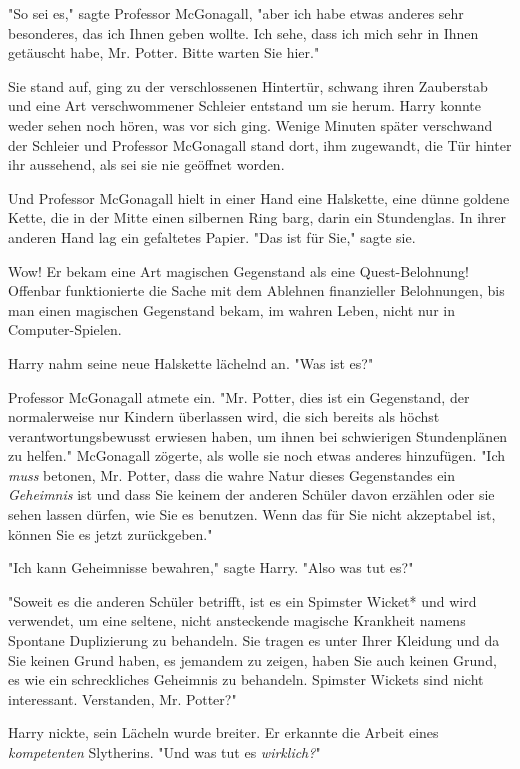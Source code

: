 {"So sei es," sagte Professor McGonagall, "aber ich habe etwas anderes sehr besonderes, das ich Ihnen geben wollte. Ich sehe, dass ich mich sehr in Ihnen getäuscht habe, Mr. Potter. Bitte warten Sie hier."

Sie stand auf, ging zu der verschlossenen Hintertür, schwang ihren Zauberstab und eine Art verschwommener Schleier entstand um sie herum. Harry konnte weder sehen noch hören, was vor sich ging. Wenige Minuten später verschwand der Schleier und Professor McGonagall stand dort, ihm zugewandt, die Tür hinter ihr aussehend, als sei sie nie geöffnet worden.

Und Professor McGonagall hielt in einer Hand eine Halskette, eine dünne goldene Kette, die in der Mitte einen silbernen Ring barg, darin ein Stundenglas. In ihrer anderen Hand lag ein gefaltetes Papier. "Das ist für Sie," sagte sie.

Wow! Er bekam eine Art magischen Gegenstand als eine Quest-Belohnung! Offenbar funktionierte die Sache mit dem Ablehnen finanzieller Belohnungen, bis man einen magischen Gegenstand bekam, im wahren Leben, nicht nur in Computer-Spielen.

Harry nahm seine neue Halskette lächelnd an. "Was ist es?"

Professor McGonagall atmete ein. "Mr. Potter, dies ist ein Gegenstand, der normalerweise nur Kindern überlassen wird, die sich bereits als höchst verantwortungsbewusst erwiesen haben, um ihnen bei schwierigen Stundenplänen zu helfen." McGonagall zögerte, als wolle sie noch etwas anderes hinzufügen. "Ich \emph{muss} betonen, Mr. Potter, dass die wahre Natur dieses Gegenstandes ein \emph{Geheimnis} ist und dass Sie keinem der anderen Schüler davon erzählen oder sie sehen lassen dürfen, wie Sie es benutzen. Wenn das für Sie nicht akzeptabel ist, können Sie es jetzt zurückgeben."

"Ich kann Geheimnisse bewahren," sagte Harry. "Also was tut es?"

"Soweit es die anderen Schüler betrifft, ist es ein Spimster Wicket* und wird verwendet, um eine seltene, nicht ansteckende magische Krankheit namens Spontane Duplizierung zu behandeln. Sie tragen es unter Ihrer Kleidung und da Sie keinen Grund haben, es jemandem zu zeigen, haben Sie auch keinen Grund, es wie ein schreckliches Geheimnis zu behandeln. Spimster Wickets sind nicht interessant. Verstanden, Mr. Potter?"

Harry nickte, sein Lächeln wurde breiter. Er erkannte die Arbeit eines \emph{kompetenten} Slytherins. "Und was tut es \emph{wirklich?}"

}
